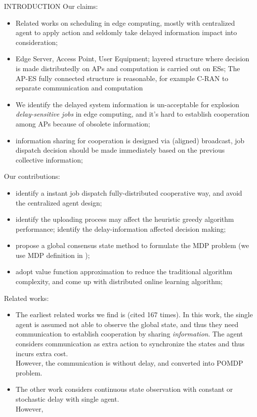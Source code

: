 \documentclass[10pt, conference, letterpaper]{IEEEtran}
\begin{document}
    \begin{section}{INTRODUCTION}
        \label{sec:introduction}
        Our claims:
        \begin{itemize}
            \item Related works on scheduling in edge computing, mostly with centralized agent to apply action and seldomly take delayed information impact into consideration;
            \item Edge Server, Access Point, User Equipment; layered structure where decision is made distributedly on APs and computation is carried out on ESs; The AP-ES fully connected structure is reasonable, for example C-RAN to separate communication and computation 
            \item We identify the delayed system information is un-acceptable for explosion \emph{delay-sensitive jobs} in edge computing, and it's hard to establish cooperation among APs because of obsolete information;
            \item information sharing for cooperation is designed via (aligned) broadcast, job dispatch decision should be made immediately based on the previous collective information;
        \end{itemize}

        Our contributions:
        \begin{itemize}
            \item identify a instant job dispatch fully-distributed cooperative way, and avoid the centralized agent design;
            \item identify the uploading process may affect the heuristic greedy algorithm performance; identify the delay-information affected decision making;
            \item propose a global consensus state method to formulate the MDP problem (we use MDP definition in \cite{sutton1998introduction});
            \item adopt value function approximation to reduce the traditional algorithm complexity, and come up with distributed online learning algorithm;
        \end{itemize}

        Related works:
        \begin{itemize}
            \item The earliest related works we find is \cite{ref-01} (cited 167 times). In this work, the single agent is assumed not able to observe the global state, and thus they need communication to establish cooperation by sharing \emph{information}. The agent considers communication as extra action to synchronize the states and thus incurs extra cost. \\
            However, the communication is without delay, and converted into POMDP problem.
            \item The other work \cite{ref-02} considers continuous state observation with constant or stochastic delay with single agent. \\
            However, 
        \end{itemize}

    \end{section}
\end{document}
